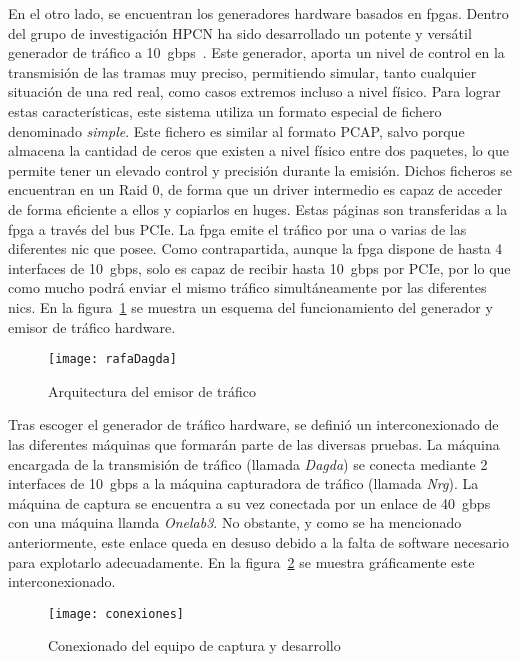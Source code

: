 En el otro lado, se encuentran los generadores hardware basados en \glspl{fpga}. Dentro del grupo de investigación HPCN ha sido desarrollado un potente y versátil generador de tráfico a 10~\gls{gbps}~\cite{zazo2014tnt10g}. Este generador, aporta un nivel de control en la transmisión de las tramas muy preciso, permitiendo simular, tanto cualquier situación de una red real, como casos extremos incluso a nivel físico.
Para lograr estas características, este sistema utiliza un formato especial de fichero denominado \textit{simple}. Este fichero es similar al formato PCAP, salvo porque almacena la cantidad de ceros que existen a nivel físico entre dos paquetes, lo que permite tener un elevado control y precisión durante la emisión. Dichos ficheros se encuentran en un Raid 0, de forma que un driver intermedio es capaz de acceder de forma eficiente a ellos y copiarlos en \glspl{huge}. Estas páginas son transferidas a la \gls{fpga} a través del bus PCIe. La \gls{fpga} emite el tráfico por una o varias de las diferentes \gls{nic} que posee. Como contrapartida, aunque la \gls{fpga} dispone de hasta 4 interfaces de 10~\gls{gbps}, solo es capaz de recibir hasta 10~\gls{gbps} por PCIe, por lo que como mucho podrá enviar el mismo tráfico simultáneamente por las diferentes \glspl{nic}. En la figura~\ref{fig:rafaDagda} se muestra un esquema del funcionamiento del generador y emisor de tráfico hardware.

\begin{figure}[!htb]
\centering
\texttt{[image: rafaDagda]}
\caption{Arquitectura del emisor de tráfico}
\label{fig:rafaDagda}
\end{figure}

Tras escoger el generador de tráfico hardware, se definió un interconexionado de las diferentes máquinas que formarán parte de las diversas pruebas. La máquina encargada de la transmisión de tráfico (llamada \textit{Dagda}) se conecta mediante 2 interfaces de 10~\gls{gbps} a la máquina capturadora de tráfico (llamada \textit{Nrg}). La máquina de captura se encuentra a su vez conectada por un enlace de 40~\gls{gbps} con una máquina llamda \textit{Onelab3}. No obstante, y como se ha mencionado anteriormente, este enlace queda en desuso debido a la falta de software necesario para explotarlo adecuadamente. En la figura~\ref{fig:conexiones} se muestra gráficamente este interconexionado.

\begin{figure}[!htb]
\centering
\texttt{[image: conexiones]}
\caption{Conexionado del equipo de captura y desarrollo}
\label{fig:conexiones}
\end{figure}

